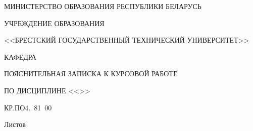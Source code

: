 \begin{center}
    МИНИСТЕРСТВО ОБРАЗОВАНИЯ РЕСПУБЛИКИ БЕЛАРУСЬ
    
    \hspace{0pt}

    УЧРЕЖДЕНИЕ ОБРАЗОВАНИЯ

    <<БРЕСТСКИЙ ГОСУДАРСТВЕННЫЙ ТЕХНИЧЕСКИЙ УНИВЕРСИТЕТ>>

    \hspace{0pt}

    КАФЕДРА \titlePageKafedra
\end{center}

\vfill

\begin{center}
    \titlePageTopic

    \hspace{0pt}

    ПОЯСНИТЕЛЬНАЯ ЗАПИСКА К КУРСОВОЙ РАБОТЕ

    ПО ДИСЦИПЛИНЕ <<\titlePageDistiplina>>
\end{center}

\vfill

\begin{center}
    КР.ПО4.\titlePageNumberWork~81~00

    \hspace{0pt}

    Листов \pageref{LastPage}
\end{center}

\vfill

